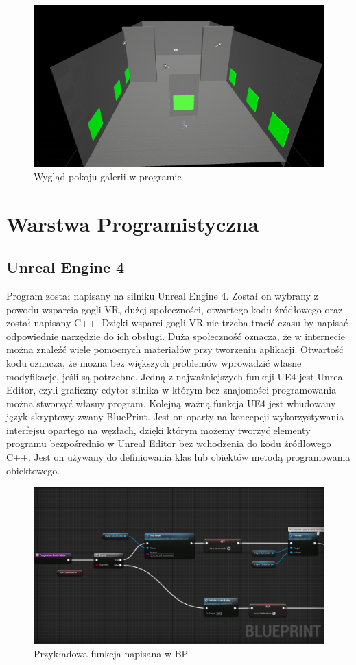 \documentclass[a4paper,12pt,reqno]{article}
\begin{document}
\begin{figure}[H]%
\centering
\includegraphics[width=0.8\columnwidth]{graphics/Level.png}
\caption{Wygląd pokoju galerii w programie
\label{OpenBrush}}%
%
\qquad
\end{figure}  

\newpage
\section{Warstwa Programistyczna}

\subsection{Unreal Engine 4}

Program został napisany na silniku Unreal Engine 4. Został on wybrany z powodu wsparcia gogli VR, dużej społeczności, otwartego kodu źródłowego oraz został napisany C++. Dzięki wsparci gogli VR nie trzeba tracić czasu by napisać odpowiednie narzędzie do ich obsługi. Duża społeczność oznacza, że w internecie można znaleźć wiele pomocnych materiałów przy tworzeniu aplikacji. Otwartość kodu oznacza, że można bez większych problemów wprowadzić własne modyfikacje, jeśli są potrzebne. Jedną z najważniejszych funkcji UE4 jest Unreal Editor, czyli graficzny edytor silnika w którym bez znajomości programowania można stworzyć własny program. Kolejną ważną funkcja UE4 jest wbudowany język skryptowy zwany BluePrint. Jest on oparty na koncepcji wykorzystywania interfejsu opartego na węzłach, dzięki którym możemy tworzyć elementy programu bezpośrednio w Unreal Editor bez wchodzenia do kodu źródłowego C++. Jest on używany do definiowania klas lub obiektów metodą programowania obiektowego.

\begin{figure}[H]%
\centering
\includegraphics[width=0.8\columnwidth]{graphics/BPExample.png}
\caption{Przykładowa funkcja napisana w BP
\label{BPExample}}%
%
\qquad
\end{figure}  
\end{document}
